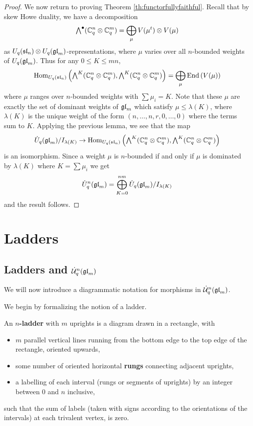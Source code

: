 \documentclass[11pt]{amsart}
\begin{document}
\begin{proof}
We now return to proving Theorem \ref{th:functorfullyfaithful}. Recall that by skew Howe duality, we have a decomposition
$$ {\textstyle\bigwedge^{\bullet}_{}} ({\mathbb{C}}_q^n \otimes {\mathbb{C}}_q^m) = \bigoplus_{\mu} V(\mu^t) \otimes V(\mu) $$
as $U_q({\mathfrak{sl}}_n) \otimes U_q({\mathfrak{gl}}_m)$-representations, where $\mu$ varies over all $n$-bounded weights of $U_q({\mathfrak{gl}}_m)$. Thus for any $ 0 \le K \le mn $,
$$ \operatorname{Hom}_{U_q({\mathfrak{sl}}_n)} \left({\textstyle\bigwedge^{K}_{}}({\mathbb{C}}_q^n \otimes {\mathbb{C}}_q^m), {\textstyle\bigwedge^{K}_{}}({\mathbb{C}}_q^n \otimes {\mathbb{C}}_q^m)\right) = \bigoplus_{\mu} \operatorname{End}\left(V(\mu)\right) $$
where $ \mu $ ranges over $ n$-bounded weights with $ \sum \mu_i = K $.  Note that these $\mu $ are exactly the set of dominant weights of $ {\mathfrak{gl}}_m $ which satisfy $ \mu \le \lambda(K) $, where $ \lambda(K) $ is the unique weight of the form $(n, \dots, n, r, 0, \dots, 0) $ where the terms sum to $K$.  Applying the previous lemma, we see that the map
$$ \dot{{U}}_q({\mathfrak{gl}}_m)/I_{\lambda(K)} \rightarrow \operatorname{Hom}_{U_q({\mathfrak{sl}}_n)} \left({\textstyle\bigwedge^{K}_{}}({\mathbb{C}}_q^n \otimes {\mathbb{C}}_q^m), {\textstyle\bigwedge^{K}_{}}({\mathbb{C}}_q^n \otimes {\mathbb{C}}_q^m)\right) $$
is an isomorphism. Since a weight $ \mu $ is $n$-bounded if and only if $ \mu $ is dominated by $ \lambda(K) $ where $ K = \sum \mu_i $ we get 
$$ \dot{{U}}_q^n({\mathfrak{gl}}_m) = \bigoplus_{K=0}^{nm} \dot{{U}}_q({\mathfrak{gl}}_m)/I_{\lambda(K)} $$
and the result follows.
\end{proof}

\section{Ladders}
\label{sec:ladders}

\subsection{Ladders and \texorpdfstring{$\dot{{\mathcal{U}}}_q^n({\mathfrak{gl}}_m)$}{U\_q gl\_m} }
We will now introduce a diagrammatic notation for morphisms in $ \dot{{\mathcal{U}}}_q^n({\mathfrak{gl}}_m)$.  


We begin by formalizing the notion of a ladder.
\begin{defn}
An {\bf $n$-ladder} with $m$ uprights is a diagram drawn in a rectangle, with
\begin{itemize}
\item $m$ parallel vertical lines running from the bottom edge to the top edge of the rectangle, oriented upwards,
\item some number of oriented horizontal {\bf rungs} connecting adjacent uprights,
\item a labelling of each interval (rungs or segments of uprights) by an integer between $0$ and $n$ inclusive,
\end{itemize}
such that the sum of labels (taken with signs according to the orientations of the intervals) at each trivalent vertex, is zero.
\end{defn}
\end{document}
